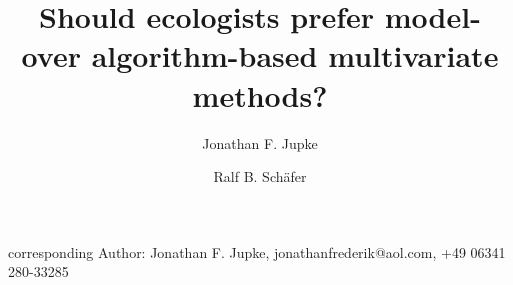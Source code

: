 \documentclass[a4paper,11pt]{article}
\begin{document}
\title{Should ecologists prefer model- over algorithm-based multivariate methods?}

\author[1]{Jonathan F. Jupke}
\author[1]{Ralf B. Schäfer}
%

\date{}




    \maketitle
    corresponding Author: Jonathan F. Jupke, jonathanfrederik@aol.com,
    +49 06341 280-33285\\


    \newpage
\end{document}
